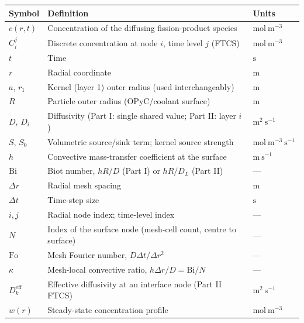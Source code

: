 \documentclass[11pt,a4paper]{article}
\newcommand{\Cd}[2]{C_{#1}^{#2}}
\newcommand{\dr}{\Delta r}
\newcommand{\dt}{\Delta t}
\newcommand{\Fo}{\mathrm{Fo}}
\newcommand{\Diff}{D}
\newcommand{\Bi}{\mathrm{Bi}}
\begin{document}
\begin{center}
\small
\begin{tabular}{@{}lp{9.3cm}l@{}}
\toprule
Symbol & Definition & Units \\
\midrule
$c(r,t)$       & Concentration of the diffusing fission-product species & $\mathrm{mol\ m^{-3}}$ \\
$\Cd{i}{j}$    & Discrete concentration at node $i$, time level $j$ (FTCS) & $\mathrm{mol\ m^{-3}}$ \\
$t$            & Time                                                  & $\mathrm{s}$ \\
$r$            & Radial coordinate                                     & $\mathrm{m}$ \\
$a$, $r_1$     & Kernel (layer 1) outer radius (used interchangeably)  & $\mathrm{m}$ \\
$R$            & Particle outer radius (OPyC/coolant surface)          & $\mathrm{m}$ \\
$D$, $D_i$     & Diffusivity (Part I: single shared value; Part II: layer $i$) & $\mathrm{m^{2}\ s^{-1}}$ \\
$S$, $S_{0}$   & Volumetric source/sink term; kernel source strength    & $\mathrm{mol\ m^{-3}\ s^{-1}}$ \\
$h$            & Convective mass-transfer coefficient at the surface   & $\mathrm{m\ s^{-1}}$ \\
$\Bi$          & Biot number, $hR/D$ (Part I) or $hR/D_L$ (Part II)    & --- \\
$\dr$          & Radial mesh spacing                                   & $\mathrm{m}$ \\
$\dt$          & Time-step size                                        & $\mathrm{s}$ \\
$i,j$          & Radial node index; time-level index                   & --- \\
$N$            & Index of the surface node (mesh-cell count, centre to surface) & --- \\
$\Fo$          & Mesh Fourier number, $\Diff\dt/\dr^{2}$               & --- \\
$\kappa$       & Mesh-local convective ratio, $h\dr/D=\Bi/N$           & --- \\
$D_k^{\mathrm{eff}}$ & Effective diffusivity at an interface node (Part II FTCS) & $\mathrm{m^{2}\ s^{-1}}$ \\
$w(r)$         & Steady-state concentration profile                    & $\mathrm{mol\ m^{-3}}$ \\

\end{tabular}
\end{center}
\end{document}
